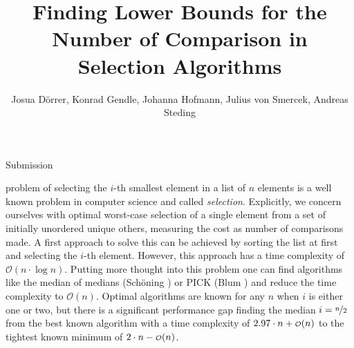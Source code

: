 \documentclass[10pt,journal,compsoc]{IEEEtran}
\newcommand\smallO{
  \mathchoice
    {{\scriptstyle\mathcal{O}}}%
    {{\scriptstyle\mathcal{O}}}%
    {{\scriptscriptstyle\mathcal{O}}}%
    {\scalebox{.50}{$\scriptscriptstyle\mathcal{O}$}}%
  }
\begin{document}
\title{Finding Lower Bounds for the Number of Comparison in Selection Algorithms}

\author{Josua Dörrer, Konrad Gendle, Johanna Hofmann, Julius von Smercek, Andreas Steding%
  }

%
{Submission}



\maketitle

\IEEEdisplaynontitleabstractindextext


\IEEEpeerreviewmaketitle

  problem of selecting the $i$-th smallest element in a list of $n$ elements is
a well known problem in computer science and called \textit{selection}. Explicitly, we
concern ourselves with optimal worst-case selection of a single element from a set of
initially unordered unique others, measuring the cost as number of comparisons made.
A first approach to solve
this can be achieved by sorting the list at first and selecting the $i$-th element. However, this
approach has a time complexity of $\mathcal{O}(n \cdot \log n)$. Putting more thought into this
problem one can find algorithms like the median of medians (Schöning \cite{Schoening1993}) or PICK
(Blum \cite{Blum1972}) and reduce the time complexity to $\mathcal{O}(n)$. Optimal algorithms are
known for any $n$ when $i$ is either one or two, but there is a significant performance gap finding
the median $i = \nicefrac{n}{2}$ from the best known algorithm with a time complexity of $2.97 \cdot
  n + \smallO(n)$ to the tightest known minimum of $2 \cdot n - \smallO(n)$.
\end{document}
